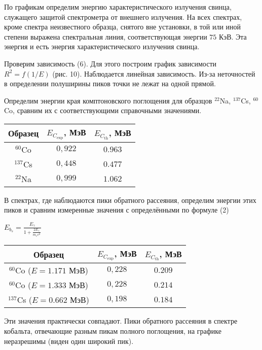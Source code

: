 По графикам определим энергию характеристического излучения свинца, служащего
защитой спектрометра от внешнего излучения. На всех спектрах, кроме спектра
неизвестного образца, снятого вне установки, в той или иной степени выражена
спектральная линия, соответствующая энергии $75$ КэВ. Эта энергия и есть энергия
характеристического излучения свинца.

Проверим зависимость (6). Для этого построим график зависимости $R^2 = f(1/E)$
(рис. 10). Наблюдается линейная зависимость. Из-за неточностей в определении
полуширины пиков точки не лежат на одной прямой.

Определим энергии края комптоновского поглощения для образцов $^{22}$Na,
$^{137}$Cs, $^{60}$Co, сравним их с соответствующими справочными значениями.

\begin{center}
\begin{table}
\begin{tabular}{| c | c | c |}
  \hline
  Образец & $E_{C_{\text{exp}}}$, МэВ & $E_{C_{\text{th}}}$, МэВ \\
  \hline
  ${}^{60}$Co & $0,922$ & $0.963$ \\
  \hline
  ${}^{137}$Cs & $0,448$ & $0.477$ \\
  \hline
  ${}^{22}$Na & $0,999$ & $1.062$ \\
  \hline
\end{tabular}
\end{table}
\end{center}

В спектрах, где наблюдаются пики обратного рассеяния, определим энергии этих
пиков и сравним измеренные значения с определёнными по формуле (2)

\begin{center}
  $E_{b_s} = \frac{E_{\gamma}}{1 + \frac{2E_{\gamma}}{m_e c^2}}$
\end{center}

\begin{center}
\begin{table}
\begin{tabular}{| c | c | c |}
  \hline
  Образец & $E_{C_{\text{exp}}}$, МэВ & $E_{C_{\text{th}}}$, МэВ \\
  \hline
  ${}^{60}$Co ($E = 1.171$ МэВ) & $0,228$ & $0.209$ \\
  \hline
  ${}^{60}$Co ($E = 1.333$ МэВ) & $0,228$ & $0.214$ \\
  \hline
  ${}^{137}$Cs ($E = 0.662$ МэВ) & $0,198$ & $0.184$ \\
  \hline
\end{tabular}
\end{table}
\end{center}

Эти значения практически совпадают. Пики обратного рассеяния в спектре кобальта,
отвечающие разным пикам полного поглощения, на графике неразрешимы (виден один
широкий пик).
